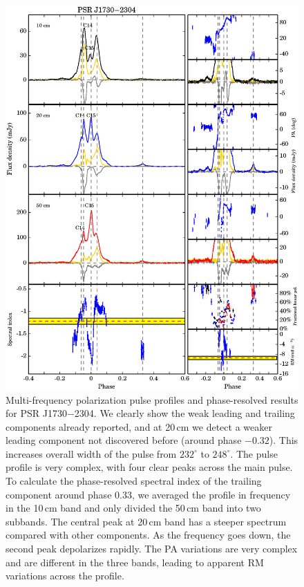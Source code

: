 \documentclass[useAMS,usenatbib]{mn2e}
\begin{document}
\begin{appendix}
\begin{figure}
\begin{center}
\includegraphics[width=6 in]{1730.ps}
\caption{Multi-frequency polarization pulse profiles and phase-resolved results for PSR J1730$-$2304. 
We clearly show the weak leading and trailing components already reported, 
and at 20\,cm we detect a weaker leading component not discovered before (around phase $-0.32$). 
This increases overall width of the pulse from $232^{\circ}$ to $248^{\circ}$.
%
The pulse profile is very complex, with four clear peaks across the main pulse.
%
To calculate the phase-resolved spectral index of the trailing component
around phase 0.33, we averaged the profile in frequency in the 10\,cm 
band and only divided the 50\,cm band into two subbands.
%
The central peak at 20\,cm band has a steeper spectrum compared with other 
components.
%
As the frequency goes down, the second peak depolarizes rapidly.
%
The PA variations are very complex and are different in the three bands, 
leading to apparent RM variations across the profile.
}
\label{1730}
\end{center}
\end{figure}


\end{appendix}
\end{document}
